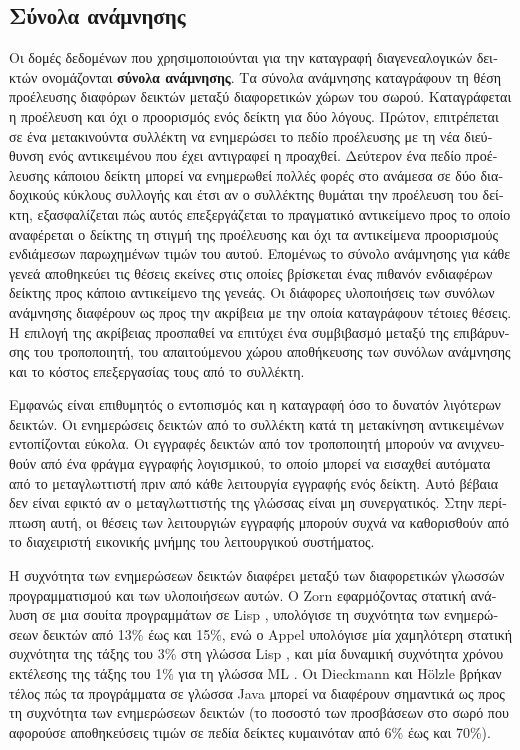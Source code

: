 \begin{greek}
\subsection{Σύνολα ανάμνησης}
Οι δομές δεδομένων που χρησιμοποιούνται για την καταγραφή διαγενεαλογικών
δεικτών ονομάζονται \textbf{σύνολα ανάμνησης}. Τα σύνολα ανάμνησης
καταγράφουν τη θέση προέλευσης διαφόρων δεικτών μεταξύ διαφορετικών
χώρων του σωρού. Καταγράφεται η προέλευση και όχι ο προορισμός
ενός δείκτη για δύο λόγους. Πρώτον, επιτρέπεται σε ένα μετακινούντα
συλλέκτη να ενημερώσει το πεδίο προέλευσης με τη νέα διεύθυνση
ενός αντικειμένου που έχει αντιγραφεί η προαχθεί. Δεύτερον ένα
πεδίο προέλευσης κάποιου δείκτη μπορεί να ενημερωθεί πολλές φορές
στο ανάμεσα σε δύο διαδοχικούς κύκλους συλλογής και έτσι αν ο
συλλέκτης θυμάται την προέλευση του δείκτη, εξασφαλίζεται πώς
αυτός επεξεργάζεται το πραγματικό αντικείμενο προς το οποίο
αναφέρεται ο δείκτης τη στιγμή της προέλευσης και όχι τα αντικείμενα
προορισμούς ενδιάμεσων παρωχημένων τιμών του αυτού. Επομένως το
σύνολο ανάμνησης για κάθε γενεά αποθηκεύει τις θέσεις εκείνες
στις οποίες βρίσκεται ένας πιθανόν ενδιαφέρων δείκτης προς κάποιο
αντικείμενο της γενεάς. Οι διάφορες υλοποιήσεις των συνόλων ανάμνησης 
διαφέρουν ως προς την ακρίβεια με την οποία καταγράφουν τέτοιες
θέσεις. Η επιλογή της ακρίβειας προσπαθεί να επιτύχει ένα
συμβιβασμό μεταξύ της επιβάρυνσης του τροποποιητή, του απαιτούμενου
χώρου αποθήκευσης των συνόλων ανάμνησης και το κόστος επεξεργασίας
τους από το συλλέκτη.

Εμφανώς είναι επιθυμητός ο εντοπισμός και η καταγραφή όσο το
δυνατόν λιγότερων δεικτών. Οι ενημερώσεις δεικτών από
το συλλέκτη κατά τη μετακίνηση αντικειμένων εντοπίζονται εύκολα.
Οι εγγραφές δεικτών από τον τροποποιητή μπορούν να ανιχνευθούν
από ένα φράγμα εγγραφής λογισμικού, το οποίο μπορεί να εισαχθεί
αυτόματα από το μεταγλωττιστή πριν από κάθε λειτουργία εγγραφής
ενός δείκτη. Αυτό βέβαια δεν είναι εφικτό αν ο μεταγλωττιστής
της γλώσσας είναι μη συνεργατικός. Στην περίπτωση αυτή, οι
θέσεις των λειτουργιών εγγραφής μπορούν συχνά να καθορισθούν
από το διαχειριστή εικονικής μνήμης του λειτουργικού συστήματος.

Η συχνότητα των ενημερώσεων δεικτών διαφέρει μεταξύ των
διαφορετικών γλωσσών προγραμματισμού και των υλοποιήσεων αυτών.
Ο Zorn εφαρμόζοντας στατική ανάλυση σε μια σουίτα προγραμμάτων
σε Lisp \cite{DBLP:conf/lfp/Zorn90}, υπολόγισε τη συχνότητα
των ενημερώσεων δεικτών από 13\% έως και 15\%, ενώ ο Appel
υπολόγισε μία χαμηλότερη στατική συχνότητα της τάξης του 3\% 
στη γλώσσα Lisp \cite{DBLP:journals/ipl/Appel87}, και μία
δυναμική συχνότητα χρόνου εκτέλεσης της τάξης του 1\% για
τη γλώσσα ML \cite{DBLP:journals/spe/Appel89a}. Οι Dieckmann
και H{\"o}lzle \cite{DBLP:conf/ecoop/DieckmannH99} βρήκαν
τέλος πώς τα προγράμματα σε γλώσσα Java μπορεί να διαφέρουν
σημαντικά ως προς τη συχνότητα των ενημερώσεων δεικτών
(το ποσοστό των προσβάσεων στο σωρό που αφορούσε αποθηκεύσεις
τιμών σε πεδία δείκτες κυμαινόταν από 6\% έως και 70\%).


\end{greek}
